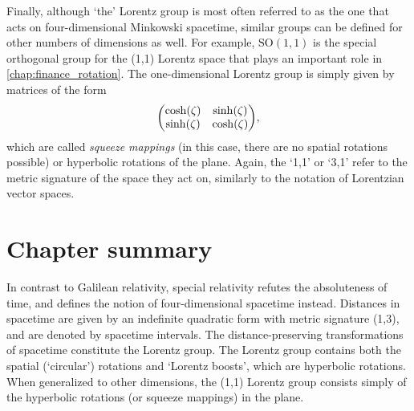 Finally, although `the' Lorentz group is most often referred to as the one that acts on four-dimensional Minkowski spacetime, similar groups can be defined for other numbers of dimensions as well. For example, $\text{SO}(1, 1)$ is the special orthogonal group for the (1,1) Lorentz space that plays an important role in \cref{chap:finance_rotation}. The one-dimensional Lorentz group is simply given by matrices of the form
$$ \mqty(\cosh(\zeta) & \sinh(\zeta)\\\sinh(\zeta)&\cosh(\zeta)), $$
which are called \emph{squeeze mappings} (in this case, there are no spatial rotations possible) or hyperbolic rotations of the plane. Again, the `1,1' or `3,1' refer to the metric signature of the space they act on, similarly to the notation of Lorentzian vector spaces.

\section*{Chapter summary}
In contrast to Galilean relativity, special relativity refutes the absoluteness of time, and defines the notion of four-dimensional spacetime instead. Distances in spacetime are given by an indefinite quadratic form with metric signature (1,3), and are denoted by spacetime intervals. The distance-preserving transformations of spacetime constitute the Lorentz group. The Lorentz group contains both the spatial (`circular') rotations and `Lorentz boosts', which are hyperbolic rotations. When generalized to other dimensions, the (1,1) Lorentz group consists simply of the hyperbolic rotations (or squeeze mappings) in the plane.
